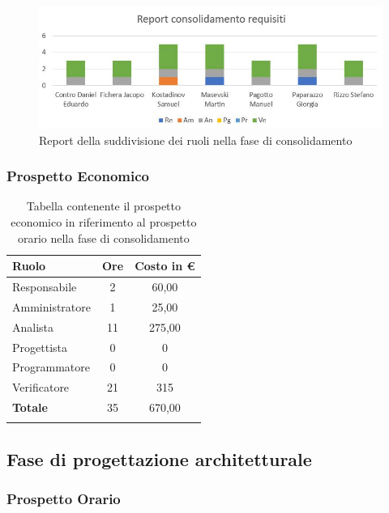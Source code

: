 \documentclass[../piano_di_progetto.tex]{subfiles}
\begin{document}
\begin{figure}[H]
\centering
\includegraphics[width=12cm]{componenti/img/report_consolidamento}
\caption{Report della suddivisione dei ruoli nella fase di consolidamento}
\end{figure}

\subsubsection{Prospetto Economico}

\begin{longtable}{|l|c|c|}
	\hline
	\rowcolor{lightgray}
	\textbf{Ruolo} & \textbf{Ore} & \textbf{Costo in €}\\
	\endhead
	\hline
	Responsabile & 2 & 60,00 \\
	Amministratore & 1 & 25,00 \\
	Analista & 11 & 275,00 \\
	Progettista & 0 & 0 \\
	Programmatore & 0 & 0 \\
	Verificatore & 21 & 315 \\
	\hline
	\textbf{Totale} & 35 & 670,00 \\
	\hline
	\rowcolor{white}
	\caption{Tabella contenente il prospetto economico in riferimento al prospetto orario nella fase di consolidamento} 
\end{longtable}


\subsection{ Fase di progettazione architetturale}%
\label{sub:fase_prog_arc}
\subsubsection{Prospetto Orario}
\end{document}
